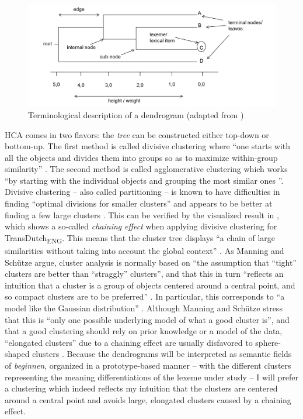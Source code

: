 \begin{figure}
\includegraphics[width=\textwidth]{figures/Vandevoorde2-img27.png}
\caption{\label{fig:3:27}  Terminological description of a dendrogram (adapted from \citealt[89]{everitt_cluster_2011})}
\end{figure}

HCA comes in two flavors: the \textit{tree} can be constructed either top-down or bottom-up. The first method is called divisive clustering where “one starts with all the objects and divides them into groups so as to maximize within-group similarity” \citep[501]{manning_foundations_1999}. The second method is called agglomerative clustering which works “by starting with the individual objects and grouping the most similar ones \citep[500--501]{manning_foundations_1999}”. Divisive clustering – also called partitioning – is known to have difficulties in finding “optimal divisions for smaller clusters” and appears to be better at finding a few large clusters \citep[138]{baayen_analyzing_2008}. This can be verified by the visualized result in , which shows a so-called \textit{chaining} \textit{effect} when applying divisive clustering for TransDutch\textsubscript{ENG}. This means that the cluster tree displays “a chain of large similarities without taking into account the global context” \citep[504]{manning_foundations_1999}. As Manning and Schütze argue, cluster analysis is normally based on “the assumption that ``tight'' clusters are better than ``straggly'' clusters”, and that this in turn “reflects an intuition that a cluster is a group of objects centered around a central point, and so compact clusters are to be preferred” \citep[506]{manning_foundations_1999}. In particular, this corresponds to “a model like the Gaussian distribution” \citep[506]{manning_foundations_1999}. Although Manning and Schütze stress that this is “only one possible underlying model of what a good cluster is”, and that a good clustering should rely on prior knowledge or a model of the data, “elongated clusters” due to a chaining effect are usually disfavored to sphere-shaped clusters \citep[506]{manning_foundations_1999}. Because the dendrograms will be interpreted as semantic fields of \textit{beginnen}, organized in a prototype-based manner – with the different clusters representing the meaning differentiations of the lexeme under study – I will prefer a clustering which indeed reflects my intuition that the clusters are centered around a central point and avoids large, elongated clusters caused by a chaining effect.


